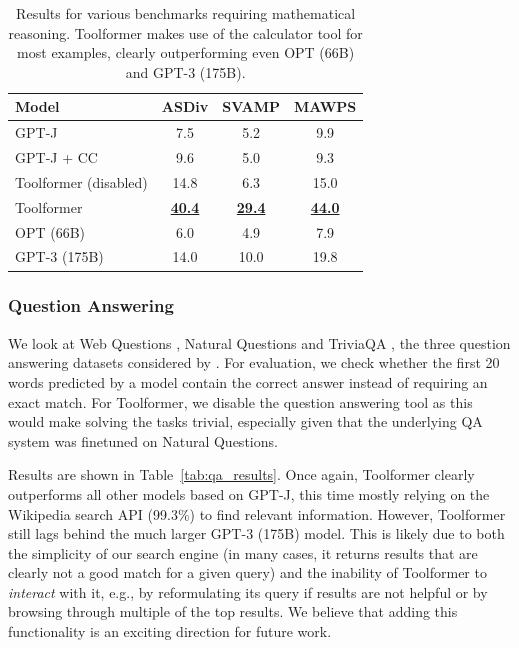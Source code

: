 \documentclass[11pt]{article}
\newcommand{\ours}[0]{Toolformer}
\begin{document}
\begin{CJK*}{UTF8}{gbsn}
\begin{table}
    \centering
    \small
    \setlength{\tabcolsep}{5pt}
    \begin{tabularx}{\linewidth}{Xccc}
        \toprule
        \textbf{Model} & \textbf{ASDiv} & \textbf{SVAMP} & \textbf{MAWPS} \\
        \midrule
         GPT-J & \phantom{0}7.5 & \phantom{0}5.2 & \phantom{0}9.9 \\         
         GPT-J + CC & \phantom{0}9.6 & \phantom{0}5.0 & \phantom{0}9.3 \\        
         \ours{} (disabled) & 14.8 & \phantom{0}6.3 & 15.0 \\
        \ours{} & \underline{\textbf{40.4}} & \underline{\textbf{29.4}} & \underline{\textbf{44.0}} \\
         \midrule
         OPT (66B) & \phantom{0}6.0 & \phantom{0}4.9 & \phantom{0}7.9 \\
         GPT-3 (175B) & 14.0 & 10.0 & 19.8 \\
         \bottomrule
    \end{tabularx}
    \caption{Results for various benchmarks requiring mathematical reasoning. \ours{} makes use of the calculator tool for most examples, clearly outperforming even OPT (66B) and GPT-3 (175B).}
    \label{tab:math_results}
\end{table}

\subsubsection{Question Answering}

We look at Web Questions \citep{berant-etal-2013-semantic}, Natural Questions \citep{kwiatkowski-etal-2019-natural} and TriviaQA \citep{joshi-etal-2017-triviaqa}, the three question answering datasets considered by \citet{brown2020language}. For evaluation, we check whether the first 20 words predicted by a model contain the correct answer instead of requiring an exact match. For \ours{}, we disable the question answering tool as this would make solving the tasks trivial, especially given that the underlying QA system was finetuned on Natural Questions.

Results are shown in Table~\ref{tab:qa_results}. Once again, \ours{} clearly outperforms all other models based on GPT-J, this time mostly relying on the Wikipedia search API (99.3\%) to find relevant information.  However, \ours{} still lags behind the much larger GPT-3 (175B) model. This is likely due to both the simplicity of our search engine (in many cases, it returns results that are clearly not a good match for a given query) and the inability of \ours{} to \emph{interact} with it, e.g., by reformulating its query if results are not helpful or by browsing through multiple of the top results. We believe that adding this functionality is an exciting direction for future work.


\end{CJK*}
\end{document}
